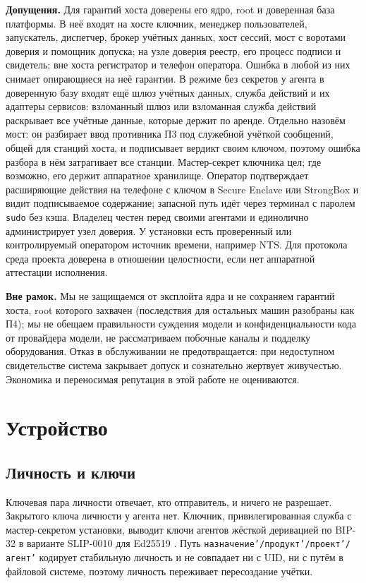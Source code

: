 \documentclass[10pt,a4paper]{article}
\begin{document}
\textbf{Допущения.} Для гарантий хоста доверены его ядро, root и доверенная база платформы. В неё входят на хосте ключник, менеджер пользователей, запускатель, диспетчер, брокер учётных данных, хост сессий, мост с воротами доверия и помощник допуска; на узле доверия реестр, его процесс подписи и свидетель; вне хоста регистратор и телефон оператора. Ошибка в любой из них снимает опирающиеся на неё гарантии. В режиме без секретов у агента в доверенную базу входят ещё шлюз учётных данных, служба действий и их адаптеры сервисов: взломанный шлюз или взломанная служба действий раскрывает все учётные данные, которые держит по аренде. Отдельно назовём мост: он разбирает ввод противника П3 под служебной учёткой сообщений, общей для станций хоста, и подписывает вердикт своим ключом, поэтому ошибка разбора в нём затрагивает все станции. Мастер-секрет ключника цел; где возможно, его держит аппаратное хранилище. Оператор подтверждает расширяющие действия на телефоне с ключом в Secure Enclave или StrongBox и видит подписываемое содержание; запасной путь идёт через терминал с паролем \texttt{sudo} без кэша. Владелец честен перед своими агентами и единолично администрирует узел доверия. У установки есть проверенный или контролируемый оператором источник времени, например NTS. Для протокола среда проекта доверена в отношении целостности, если нет аппаратной аттестации исполнения.

\textbf{Вне рамок.} Мы не защищаемся от эксплойта ядра и не сохраняем гарантий хоста, root которого захвачен (последствия для остальных машин разобраны как П4); мы не обещаем правильности суждения модели и конфиденциальности кода от провайдера модели, не рассматриваем побочные каналы и подделку оборудования. Отказ в обслуживании не предотвращается: при недоступном свидетельстве система закрывает допуск и сознательно жертвует живучестью. Экономика и переносимая репутация в этой работе не оцениваются.

\section{Устройство}
\label{sec:design}

\subsection{Личность и ключи}
\label{sec:keys}

Ключевая пара личности отвечает, кто отправитель, и ничего не разрешает. Закрытого ключа личности у агента нет. Ключник, привилегированная служба с мастер-секретом установки, выводит ключи агентов жёсткой деривацией по BIP-32 в варианте SLIP-0010 для Ed25519 \cite{bip32,slip10}. Путь \texttt{назначение'/\allowbreak продукт'/\allowbreak проект'/\allowbreak агент'} кодирует стабильную личность и не совпадает ни с UID, ни с путём в файловой системе, поэтому личность переживает пересоздание учётки.
\end{document}
